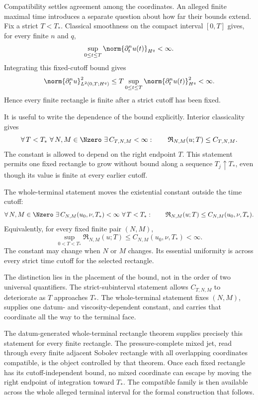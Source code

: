 Compatibility settles agreement among the coordinates.
An alleged finite maximal time introduces a separate question about how far their bounds extend.
Fix a strict \(T<T_*\).
Classical smoothness on the compact interval \([0,T]\) gives, for every finite \(n\) and \(q\),
\[
  \sup_{0\leq t\leq T}
  \norm{\partial_t^n u(t)}_{H^q}
  <\infty.
\]
Integrating this fixed-cutoff bound gives
\[
  \norm{\partial_t^n u}_{L^2(0,T;H^q)}^2
  \leq
  T
  \sup_{0\leq t\leq T}
  \norm{\partial_t^n u(t)}_{H^q}^2
  <\infty.
\]
Hence every finite rectangle is finite after a strict cutoff has been fixed.

It is useful to write the dependence of the bound explicitly.
Interior classicality gives
\[
  \forall\,T<T_*
  \ \forall\,N,M\in\Nzero
  \ \exists\,C_{T,N,M}<\infty:
  \qquad
  \mathfrak R_{N,M}(u;T)
  \leq
  C_{T,N,M}.
\]
The constant is allowed to depend on the right endpoint \(T\).
This statement permits one fixed rectangle to grow without bound along a sequence \(T_j\uparrow T_*\), even though its value is finite at every earlier cutoff.

The whole-terminal statement moves the existential constant outside the time cutoff:
\[
  \forall\,N,M\in\Nzero
  \ \exists\,C_{N,M}(u_0,\nu,T_*)<\infty
  \ \forall\,T<T_*:
  \qquad
  \mathfrak R_{N,M}(u;T)
  \leq
  C_{N,M}(u_0,\nu,T_*).
\]
Equivalently, for every fixed finite pair \((N,M)\),
\[
  \sup_{0<T<T_*}
  \mathfrak R_{N,M}(u;T)
  \leq
  C_{N,M}(u_0,\nu,T_*)
  <\infty.
\]
The constant may change when \(N\) or \(M\) changes.
Its essential uniformity is across every strict time cutoff for the selected rectangle.

The distinction lies in the placement of the bound, not in the order of two universal quantifiers.
The strict-subinterval statement allows \(C_{T,N,M}\) to deteriorate as \(T\) approaches \(T_*\).
The whole-terminal statement fixes \((N,M)\), supplies one datum- and viscosity-dependent constant, and carries that coordinate all the way to the terminal face.

The datum-generated whole-terminal rectangle theorem supplies precisely this statement for every finite rectangle.
The pressure-complete mixed jet, read through every finite adjacent Sobolev rectangle with all overlapping coordinates compatible, is the object controlled by that theorem.
Once each fixed rectangle has its cutoff-independent bound, no mixed coordinate can escape by moving the right endpoint of integration toward \(T_*\).
The compatible family is then available across the whole alleged terminal interval for the formal construction that follows.
